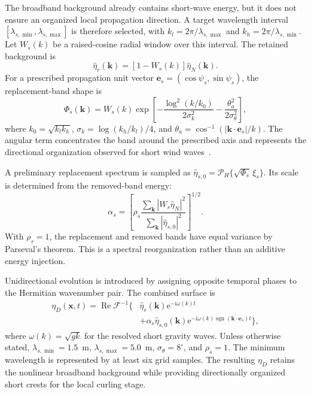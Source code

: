 The broadband background already contains short-wave energy, but it does not ensure an organized local propagation direction. A target wavelength interval $[\lambda_{s,\min},\lambda_{s,\max}]$ is therefore selected, with $k_l=2\pi/\lambda_{s,\max}$ and $k_h=2\pi/\lambda_{s,\min}$. Let $W_s(k)$ be a raised-cosine radial window over this interval. The retained background is
\begin{equation}
\widehat{\eta}_r(\boldsymbol{k})=\left[1-W_s(k)\right]\widehat{\eta}_N(\boldsymbol{k}).
\label{eq:short_wave_band_removal}
\end{equation}
For a prescribed propagation unit vector $\boldsymbol{e}_s=(\cos\psi_s,\sin\psi_s)$, the replacement-band shape is
\begin{equation}
\Phi_s(\boldsymbol{k})=W_s(k)\exp\!\left[-\frac{\log^2(k/k_0)}{2\sigma_k^2}-\frac{\theta_a^2}{2\sigma_\theta^2}\right],
\label{eq:directional_short_wave_shape}
\end{equation}
where $k_0=\sqrt{k_lk_h}$, $\sigma_k=\log(k_h/k_l)/4$, and $\theta_a=\cos^{-1}(|\boldsymbol{k}\cdot\boldsymbol{e}_s|/k)$. The angular term concentrates the band around the prescribed axis and represents the directional organization observed for short wind waves~\cite{sergievskaya2024shortwaves}.

A preliminary replacement spectrum is sampled as $\widehat{\eta}_{s,0}=\mathcal{P}_H\{\sqrt{\Phi_s}\,\xi_s\}$. Its scale is determined from the removed-band energy:
\begin{equation}
\alpha_s=\left[\rho_s\frac{\displaystyle\sum_{\boldsymbol{k}}|W_s\widehat{\eta}_N|^2}{\displaystyle\sum_{\boldsymbol{k}}|\widehat{\eta}_{s,0}|^2}\right]^{1/2}.
\label{eq:short_wave_energy_normalization}
\end{equation}
With $\rho_s=1$, the replacement and removed bands have equal variance by Parseval's theorem. This is a spectral reorganization rather than an additive energy injection.

Unidirectional evolution is introduced by assigning opposite temporal phases to the Hermitian wavenumber pair. The combined surface is
\begin{align}
\eta_D(\boldsymbol{x},t)=\operatorname{Re}\mathcal{F}^{-1}\!\bigg\{&\widehat{\eta}_r(\boldsymbol{k})\mathrm{e}^{-\mathrm{i}\omega(k)t}
\nonumber\\
&+\alpha_s\widehat{\eta}_{s,0}(\boldsymbol{k})\mathrm{e}^{-\mathrm{i}\omega(k)\operatorname{sgn}(\boldsymbol{k}\cdot\boldsymbol{e}_s)t}\bigg\},
\label{eq:combined_nonlinear_directional_surface}
\end{align}
where $\omega(k)=\sqrt{gk}$ for the resolved short gravity waves. Unless otherwise stated, $\lambda_{s,\min}=1.5$~m, $\lambda_{s,\max}=5.0$~m, $\sigma_\theta=8^{\circ}$, and $\rho_s=1$. The minimum wavelength is represented by at least six grid samples. The resulting $\eta_D$ retains the nonlinear broadband background while providing directionally organized short crests for the local curling stage.


